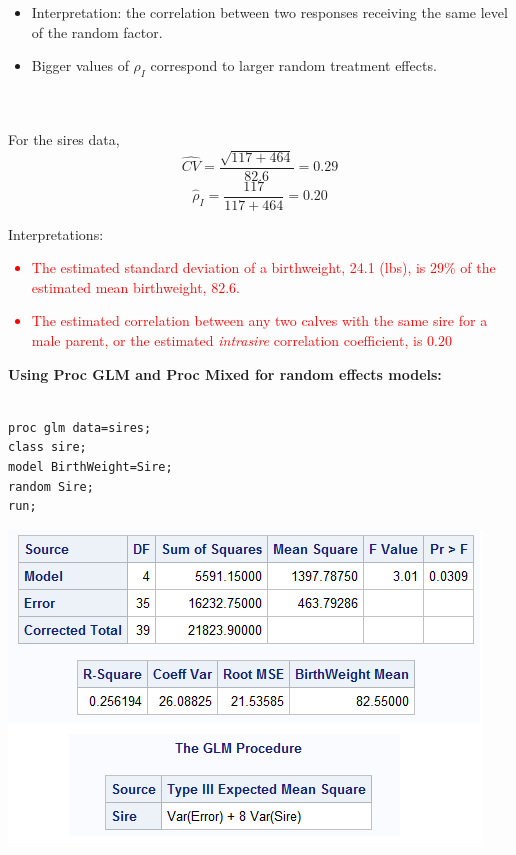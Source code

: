 \begin{itemize}
\item Interpretation: the correlation between two responses receiving the same level of the random factor.
\item Bigger values of $\rho_I$ correspond to larger random treatment effects.
\end{itemize}
~\\~\\
For the sires data,
$$\widehat{CV}  =  \frac{\sqrt{117 + 464}}{82.6} = 0.29 $$
$$\hat\rho_I = \frac{117}{117+464} = 0.20$$ 

Interpretations:\textcolor{red}{
\begin{itemize}
\item The estimated standard deviation of a birthweight, 24.1 (lbs), is $29\%$ of the estimated mean birthweight, $82.6$.
\item The estimated correlation between any two calves with the same sire for a male parent, or the estimated {\em intrasire} correlation
coefficient, is $0.20$
\end{itemize}}

\newpage

\textbf{Using Proc GLM and Proc Mixed for random effects models:}\\~\\
\begin{small}
\begin{verbatim}
proc glm data=sires;                 
class sire;                          
model BirthWeight=Sire;              
random Sire;                         
run;                                 
\end{verbatim}
\end{small}

\begin{center}
\includegraphics[scale=0.8]{Sire1}
\end{center}


